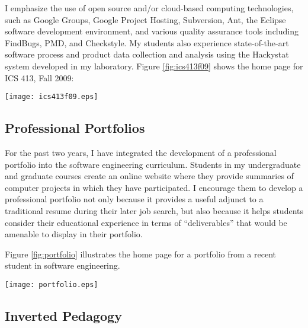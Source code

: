 \documentclass[11pt]{article}
\begin{document}
I emphasize the use of open source and/or cloud-based computing
technologies, such as Google Groups, Google Project Hosting, Subversion,
Ant, the Eclipse software development environment, and various quality
assurance tools including FindBugs, PMD, and Checkstyle.  My students also
experience state-of-the-art software process and product data collection
and analysis using the Hackystat system developed in my laboratory.  Figure
\ref{fig:ics413f09} shows the home page for ICS 413, Fall 2009:

 \begin{figure*}[ht]
  \center
  \texttt{[image: ics413f09.eps]}
  \caption{ICS 413, Fall 2009 Home Page}
  \label{fig:ics413f09}
\end{figure*}  

\subsection{Professional Portfolios}

For the past two years, I have integrated the development of a professional
portfolio into the software engineering curriculum.   Students in my
undergraduate and graduate courses create an online website where they
provide summaries of computer projects in which they have participated.
I encourage them to develop a professional portfolio not only because it
provides a useful adjunct to a traditional resume during their later job
search, but also because it helps students consider their educational
experience in terms of ``deliverables'' that would be amenable to display
in their portfolio.   

Figure \ref{fig:portfolio} illustrates the home page for a portfolio from a
recent student in software engineering.

 \begin{figure*}[ht]
  \center
  \texttt{[image: portfolio.eps]}
  \caption{Example Professional Portfolio}
  \label{fig:portfolio}
\end{figure*}  




\subsection{Inverted Pedagogy}
\end{document}
